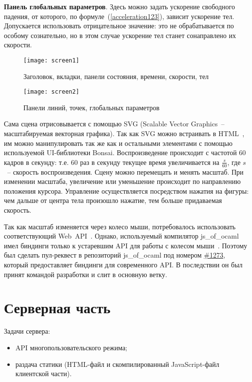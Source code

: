 \textbf{Панель глобальных параметров}. Здесь можно задать ускорение
свободного падения, от которого, по формуле~(\ref{acceleration123}), зависит ускорение тел.
Допускается использовать отрицательное значение: это не обрабатывается по особому сознательно,
но в этом случае ускорение тел станет сонаправлено их скорости.

\begin{figure}[H]
    \centering
    \texttt{[image: screen1]}
    \caption{Заголовок, вкладки, панели состояния, времени, скорости, тел\label{screen1fig}}
\end{figure}

\begin{figure}[H]
    \centering
    \texttt{[image: screen2]}
    \caption{Панели линий, точек, глобальных параметров\label{screen2fig}}
\end{figure}

Сама сцена отрисовывается с помощью SVG (Scalable Vector Graphics~-- масштабируемая векторная графика).
Так как SVG можно встраивать в HTML~\cite{mdnsvgtag}, им можно манипулировать так же как и остальными элементами с помощью используемой UI-библиотеки Bonsai.
Воспроизведение происходит с частотой 60 кадров в секунду:
т.е. 60 раз в секунду текущее время увеличивается на \(\frac{s}{60}\), где \(s\)~-- скорость воспроизведения.
Сцену можно перемещать и менять масштаб. При изменении масштаба, увеличение или уменьшение происходит по направлению положения курсора.
Управление осуществляется посредством нажатия на фигуры: чем дальше от центра тела произошло нажатие, тем больше придаваемая скорость.

Так как масштаб изменяется через колесо мыши, потребовалось использовать соответствующий Web~API~\cite{mdn-wheel}.
Однако, используемый компилятор js\_of\_ocaml имел биндинги только к устаревшим API для работы с колесом мыши~\cite{jsoo-issue-1272}.
Поэтому был сделать пул-реквест в репозиторий js\_of\_ocaml под номером
\href{https://github.com/ocsigen/js\_of\_ocaml/pull/1273}{\#1273}, который предоставляет биндинги для современного API.
В последствии он был принят командой разработки и слит в основную ветку.

\section{Серверная часть}\label{serverimpl}

Задачи сервера:

\begin{itemize}
    \item API многопользовательского режима;
    \item раздача статики (HTML-файл и скомпилированный JavaScript-файл клиентской части).
\end{itemize}

